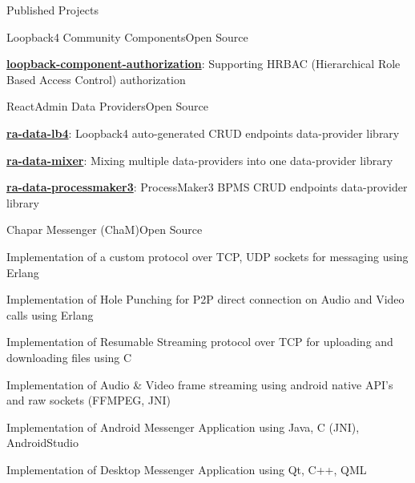 \documentclass[]{main}
\begin{document}
\begin{section}{Published Projects}
\begin{subsection}{Loopback4 Community Components}{Open Source}{}{}
        \item \href{https://github.com/loopback4/loopback-component-authorization}{\textbf{loopback-component-authorization}}: Supporting HRBAC (Hierarchical Role Based Access Control) authorization \;\href{https://github.com/loopback4/loopback-component-authorization}{\faExternalLink*}
        \end{subsection}
\begin{subsection}{ReactAdmin Data Providers}{Open Source}{}{}
        \item \href{https://github.com/loopback4/ra-data-lb4}{\textbf{ra-data-lb4}}: Loopback4 auto-generated CRUD endpoints data-provider library \;\href{https://github.com/loopback4/ra-data-lb4}{\faExternalLink*}
        \item \href{https://github.com/ckoliber/ra-data-mixer}{\textbf{ra-data-mixer}}: Mixing multiple data-providers into one data-provider library \;\href{https://github.com/ckoliber/ra-data-mixer}{\faExternalLink*}
        \item \href{https://github.com/ckoliber/ra-data-processmaker3}{\textbf{ra-data-processmaker3}}: ProcessMaker3 BPMS CRUD endpoints data-provider library \;\href{https://github.com/ckoliber/ra-data-processmaker3}{\faExternalLink*}
        \end{subsection}
\begin{subsection}{Chapar Messenger (ChaM)}{Open Source}{}{}
        \item Implementation of a custom protocol over TCP, UDP sockets for messaging using Erlang 
        \item Implementation of Hole Punching for P2P direct connection on Audio and Video calls using Erlang 
        \item Implementation of Resumable Streaming protocol over TCP for uploading and downloading files using C 
        \item Implementation of Audio \& Video frame streaming using android native API's and raw sockets (FFMPEG, JNI) 
        \item Implementation of Android Messenger Application using Java, C (JNI), AndroidStudio 
        \item Implementation of Desktop Messenger Application using Qt, C++, QML 
        \end{subsection}

\end{section}

\end{document}
